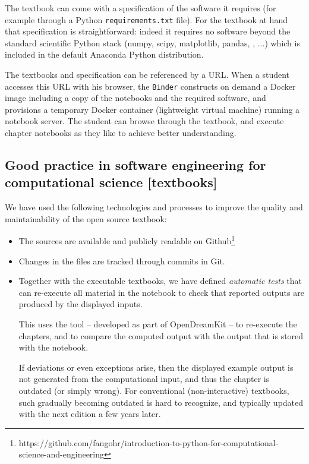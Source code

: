 \documentclass{deliverablereport}
\begin{document}
{{{\begin{enumerate}
  The textbook can come with a specification of the software it
  requires (for example through a Python \texttt{requirements.txt}
  file). For the textbook at hand that specification is
  straightforward: indeed it requires no software beyond the standard
  scientific Python stack (numpy, scipy, matplotlib, pandas, \Jupyter,
  ...) which is included in the default Anaconda Python distribution.

  The textbooks and specification can be referenced by a URL. When a
  student accesses this URL with his browser, the \texttt{Binder}
  constructs on demand a Docker image including a copy of the
  notebooks and the required software, and provisions a temporary
  Docker container (lightweight virtual machine) running a \Jupyter
  notebook server. The student can browse through the textbook, and
  execute chapter notebooks as they like to achieve better
  understanding.
\end{enumerate}

\subsection{Good practice in software engineering for
  computational science [textbooks]}\label{sec:good-pract-softw}

We have used the following technologies and processes to improve the
quality and maintainability of the open source textbook:
\begin{itemize}
  
\item The sources are available and publicly readable on
  Github\footnote{https://github.com/fangohr/introduction-to-python-for-computational-science-and-engineering}
\item Changes in the files are tracked through commits in Git.
\item Together with the executable textbooks, we have defined
  \emph{automatic tests} that can re-execute all material in the
  notebook to check that reported outputs are produced by the
  displayed inputs.

  This uses the \nbval tool -- developed as part of OpenDreamKit -- to
  re-execute the chapters, and to compare the computed output with the
  output that is stored with the notebook.

  If deviations or even exceptions arise, then the displayed example
  output is not generated from the computational input, and thus the
  chapter is outdated (or simply wrong). For conventional
  (non-interactive) textbooks, such gradually becoming outdated is
  hard to recognize, and typically updated with the next edition a
  few years later.


\end{itemize}}}}
\end{document}
